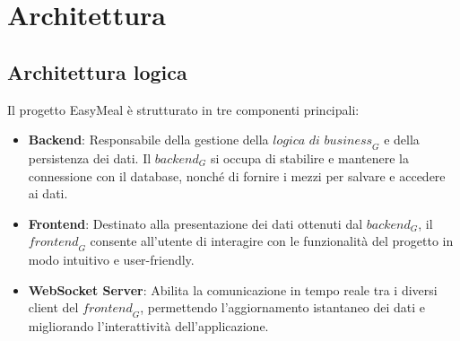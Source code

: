 \section{Architettura}

\subsection{Architettura logica}
Il progetto EasyMeal è strutturato in tre componenti principali:
\begin{itemize}
\item \textbf{Backend}: Responsabile della gestione della $\textit{logica di business}_G$ e della persistenza dei dati. Il $\textit{backend}_G$ si occupa di stabilire e mantenere la connessione con il database, nonché di fornire i mezzi per salvare e accedere ai dati.
\item \textbf{Frontend}: Destinato alla presentazione dei dati ottenuti dal $\textit{backend}_G$, il $\textit{frontend}_G$ consente all'utente di interagire con le funzionalità del progetto in modo intuitivo e user-friendly.
\item \textbf{WebSocket Server}: Abilita la comunicazione in tempo reale tra i diversi client del $\textit{frontend}_G$, permettendo l'aggiornamento istantaneo dei dati e migliorando l'interattività dell'applicazione.
\end{itemize}
